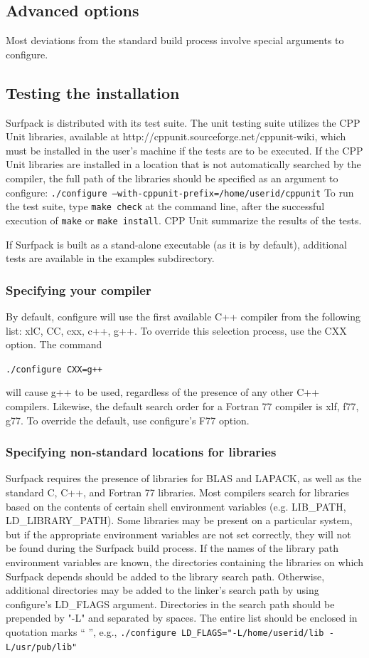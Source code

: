 \documentclass{article}
\begin{document}
\subsection{Advanced options}
Most deviations from the standard build process involve special arguments to configure.
\subsection{Testing the installation}
Surfpack is distributed with its test suite.  The unit testing suite utilizes the CPP Unit libraries, available at http://cppunit.sourceforge.net/cppunit-wiki, which must be installed in the user's machine if the tests are to be executed.  If the CPP Unit libraries are installed in a location that is not automatically searched by the compiler, the full path of the libraries should be specified as an argument to configure:
\texttt{./configure --with-cppunit-prefix=/home/userid/cppunit}
To run the test suite, type \texttt{make check} at the command line, after the successful execution of \texttt{make} or \texttt{make install}.  CPP Unit summarize the results of the tests.

If Surfpack is built as a stand-alone executable (as it is by default), additional tests are available in the examples subdirectory.

\subsubsection{Specifying your compiler}
By default, configure will use the first available C++ compiler from the following list: xlC, CC, cxx, c++, g++.  To override this selection process, use the CXX option.  The command

\texttt{./configure CXX=g++}

will cause g++ to be used, regardless of the presence of any other C++ compilers.  Likewise, the default search order for a Fortran 77 compiler is xlf, f77, g77.  To override the default, use configure's F77 option.

\subsubsection{Specifying non-standard locations for libraries}
Surfpack requires the presence of libraries for BLAS and LAPACK, as well as the standard C, C++, and Fortran 77 libraries.  Most compilers search for libraries based on the contents of certain shell environment variables (e.g. LIB\_PATH, LD\_LIBRARY\_PATH).  Some libraries may be present on a particular system, but if the appropriate environment variables are not set correctly, they will not be found during the Surfpack build process.  If the names of the library path environment variables are known, the directories containing the libraries on which Surfpack depends should be added to the library search path.  Otherwise, additional directories may be added to the linker's search path by using configure's LD\_FLAGS argument.  Directories in the search path should be prepended by "-L" and separated by spaces.  The entire list should be enclosed in quotation marks `` '', e.g.,
\texttt{./configure LD\_FLAGS="-L/home/userid/lib -L/usr/pub/lib"}
\end{document}
